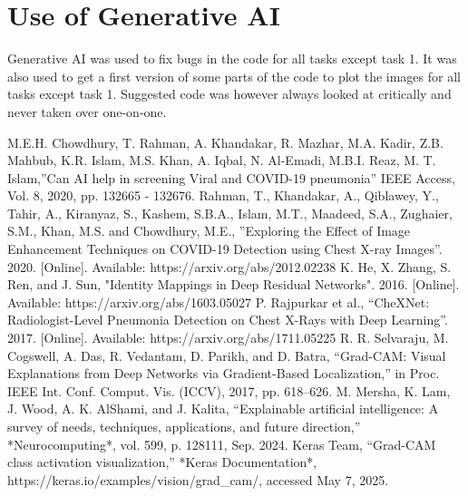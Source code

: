 \documentclass[conference]{IEEEtran}
\begin{document}
\section{Use of Generative AI}\label{sec:generative_AI}
Generative AI was used to fix bugs in the code for all tasks except task 1. It was also used to get a first version of some parts of the code to plot the images for all tasks except task 1. Suggested code was however always looked at critically and never taken over one-on-one.


\begin{thebibliography}{00}
 M.E.H. Chowdhury, T. Rahman, A. Khandakar, R. Mazhar, M.A. Kadir, Z.B. Mahbub, K.R. Islam, M.S. Khan, A. Iqbal, N. Al-Emadi, M.B.I. Reaz, M. T. Islam,''Can AI help in screening Viral and COVID-19 pneumonia'' IEEE Access, Vol. 8, 2020, pp. 132665 - 132676.
 Rahman, T., Khandakar, A., Qiblawey, Y., Tahir, A., Kiranyaz, S., Kashem, S.B.A., Islam, M.T., Maadeed, S.A., Zughaier, S.M., Khan, M.S. and Chowdhury, M.E., ''Exploring the Effect of Image Enhancement Techniques on COVID-19 Detection using Chest X-ray Images''. 2020. [Online]. Available: https://arxiv.org/abs/2012.02238
 K. He, X. Zhang, S. Ren, and J. Sun, "Identity Mappings in Deep Residual Networks". 2016. [Online]. Available: https://arxiv.org/abs/1603.05027
 P. Rajpurkar et al., ``CheXNet: Radiologist-Level Pneumonia Detection on Chest X-Rays with Deep Learning''. 2017. [Online]. Available: https://arxiv.org/abs/1711.05225
 R. R. Selvaraju, M. Cogswell, A. Das, R. Vedantam, D. Parikh, and D. Batra, ``Grad-CAM: Visual Explanations from Deep Networks via Gradient-Based Localization,'' in Proc. IEEE Int. Conf. Comput. Vis. (ICCV), 2017, pp. 618--626.
 M. Mersha, K. Lam, J. Wood, A. K. AlShami, and J. Kalita, ``Explainable artificial intelligence: A survey of needs, techniques, applications, and future direction,'' *Neurocomputing*, vol. 599, p. 128111, Sep. 2024.
 Keras Team, ``Grad-CAM class activation visualization,'' *Keras Documentation*, https://keras.io/examples/vision/grad\_cam/, accessed May 7, 2025.
\end{thebibliography}
\end{document}
